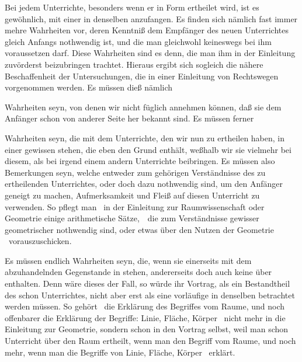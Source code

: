 \clearpage\linenumbers%
Bei jedem Unterrichte, besonders wenn er in  Form ertheilet wird, ist es gewöhnlich, mit einer  in denselben anzufangen. Es finden sich nämlich fast immer mehre Wahrheiten vor, deren Kenntniß dem Empfänger des neuen Unterrichtes gleich Anfangs nothwendig ist, und die man gleichwohl keineswegs bei ihm voraussetzen darf. Diese Wahrheiten sind es denn, die man ihm in der Einleitung zuvörderst beizubringen trachtet. Hieraus ergibt sich sogleich die nähere Beschaffenheit der Untersuchungen, die in einer Einleitung von Rechtswegen vorgenommen werden. Es müssen dieß nämlich
\begin{aufza}[a)]
\item Wahrheiten seyn, von denen wir nicht füglich annehmen können, daß sie dem Anfänger schon von anderer Seite her bekannt sind. Es müssen ferner
\item Wahrheiten seyn, die mit dem Unterrichte, den wir nun zu ertheilen haben, in einer gewissen  stehen, die eben den Grund enthält, weßhalb wir sie vielmehr bei diesem, als bei irgend einem andern Unterrichte beibringen. Es müssen also Bemerkungen seyn, welche entweder zum gehörigen Verständnisse des zu ertheilenden Unterrichtes, oder doch dazu nothwendig sind, um den Anfänger geneigt zu machen, Aufmerksamkeit und Fleiß auf diesen Unterricht zu verwenden. So pflegt man \zB\ in der Einleitung zur Raumwissenschaft oder Geometrie einige arithmetische Sätze,~\ die zum Verständnisse gewisser geometrischer nothwendig sind, oder etwas über den Nutzen der Geometrie \udgl\ vorauszuschicken.
\item Es müssen endlich Wahrheiten seyn, die, wenn sie einerseits mit dem abzuhandelnden Gegenstande in  stehen, andererseits doch auch keine  über  enthalten. Denn wäre dieses der Fall, so würde ihr Vortrag, als ein Bestandtheil des schon  Unterrichtes, nicht aber erst als eine vorläufige  in denselben betrachtet werden müssen. So gehört \zB\ die Erklärung des Begriffes vom Raume, und noch offenbarer die Erklärung der Begriffe: Linie, Fläche, Körper \usw\ nicht mehr in die Einleitung zur Geometrie, sondern schon in den Vortrag selbst, weil man schon Unterricht über den Raum ertheilt, wenn man den Begriff vom Raume, und noch mehr, wenn man die Begriffe von Linie, Fläche, Körper \usw\ erklärt.
\end{aufza}\par

